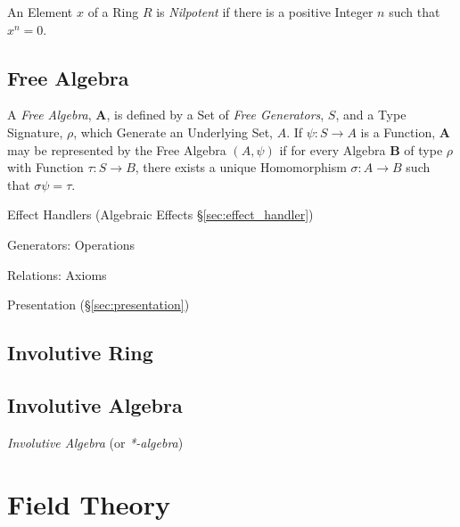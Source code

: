 An Element $x$ of a Ring $R$ is \emph{Nilpotent} if there is a
positive Integer $n$ such that $x^n = 0$.



\subsection{Free Algebra}\label{sec:free_algebra}

A \emph{Free Algebra}, $\mathbf{A}$, is defined by a Set of \emph{Free
  Generators}, $S$, and a Type Signature, $\rho$, which Generate an
Underlying Set, $A$. If $\psi : S \rightarrow A$ is a Function,
$\mathbf{A}$ may be represented by the Free Algebra $(A,\psi)$ if for
every Algebra $\mathbf{B}$ of type $\rho$ with Function $\tau : S
\rightarrow B$, there exists a unique Homomorphism $\sigma : A
\rightarrow B$ such that $\sigma\psi = \tau$.

Effect Handlers (Algebraic Effects \S\ref{sec:effect_handler})

Generators: Operations

Relations: Axioms

Presentation (\S\ref{sec:presentation})



\subsection{Involutive Ring}\label{sec:involutive_ring}

\subsection{Involutive Algebra}\label{sec:involutive_algebra}

\emph{Involutive Algebra} (or \emph{*-algebra})



\section{Field Theory}\label{sec:field_theory}

